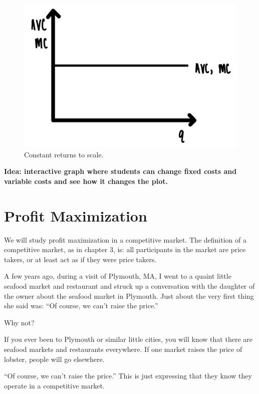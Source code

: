 \documentclass[
]{book}
\begin{document}
\begin{figure}

{\centering \includegraphics[width=0.75\linewidth]{img/supply/fig4} 

}

\caption{Constant returns to scale.}\label{fig:supply04}
\end{figure}

\begin{addition}
\textbf{Idea: interactive graph where students can change fixed costs and variable costs and see how it changes the plot.}

\end{addition}

\hypertarget{profit-maximization}{%
\section{Profit Maximization}\label{profit-maximization}}

We will study profit maximization in a competitive market. The definition of a competitive market, as in chapter 3, is: all participants in the market are price takers, or at least act as if they were price takers.

A few years ago, during a visit of Plymouth, MA, I went to a quaint little seafood market and restaurant and struck up a conversation with the daughter of the owner about the seafood market in Plymouth. Just about the very first thing she said was: ``Of course, we can't raise the price.''

Why not?

If you ever been to Plymouth or similar little cities, you will know that there are seafood markets and restaurants everywhere. If one market raises the price of lobster, people will go elsewhere.

``Of course, we can't raise the price.'' This is just expressing that they know they operate in a competitive market.
\end{document}
